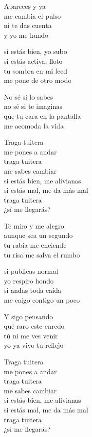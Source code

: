 \begin{lyrics}
Apareces y ya\\
me cambia el pulso\\
ni te das cuenta\\
y yo me hundo

si estás bien, yo subo\\
si estás activa, floto\\
tu sombra en mi feed\\
me pone de otro modo

No sé si lo sabes\\
no sé si te imaginas\\
que tu cara en la pantalla\\
me acomoda la vida

Traga tuitera\\
me pones a andar\\
traga tuitera\\
me sabes cambiar\\
si estás bien, me alivianas\\
si estás mal, me da más mal\\
traga tuitera\\
¿sí me llegarás?

Te miro y me alegro\\
aunque sea un segundo\\
tu rabia me enciende\\
tu risa me salva el rumbo

si publicas normal\\
yo respiro hondo\\
si andas toda caída\\
me caigo contigo un poco

Y sigo pensando\\
qué raro este enredo\\
tú ni me ves venir\\
yo ya vivo tu reflejo

Traga tuitera\\
me pones a andar\\
traga tuitera\\
me sabes cambiar\\
si estás bien, me alivianas\\
si estás mal, me da más mal\\
traga tuitera\\
¿sí me llegarás?


\end{lyrics}

